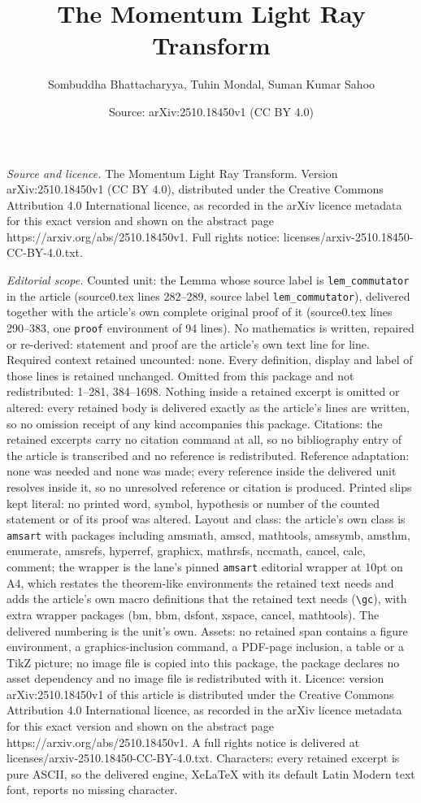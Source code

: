 \documentclass[10pt,a4paper]{amsart}
\title[The Momentum Light Ray Transform]{The Momentum Light Ray Transform}
\author{Sombuddha Bhattacharyya, Tuhin Mondal, Suman Kumar Sahoo}
\date{Source: arXiv:2510.18450v1 (CC BY 4.0)}
\begin{document}
\maketitle

\noindent\emph{Source and licence.} The Momentum Light Ray Transform. Version arXiv:2510.18450v1 (CC BY 4.0), distributed under the Creative Commons Attribution 4.0 International licence, as recorded in the arXiv licence metadata for this exact version and shown on the abstract page https://arxiv.org/abs/2510.18450v1. Full rights notice: licenses/arxiv-2510.18450-CC-BY-4.0.txt.\par\smallskip

\noindent\textit{Editorial scope.} Counted unit: the Lemma whose source label is \texttt{lem\_commutator} in the article (source0.tex lines 282--289, source label \texttt{lem\_commutator}), delivered together with the article's own complete original proof of it (source0.tex lines 290--383, one \texttt{proof} environment of 94 lines). No mathematics is written, repaired or re-derived: statement and proof are the article's own text line for line. Required context retained uncounted: none. Every definition, display and label of those lines is retained unchanged. Omitted from this package and not redistributed: 1--281, 384--1698. Nothing inside a retained excerpt is omitted or altered: every retained body is delivered exactly as the article's lines are written, so no omission receipt of any kind accompanies this package. Citations: the retained excerpts carry no citation command at all, so no bibliography entry of the article is transcribed and no reference is redistributed. Reference adaptation: none was needed and none was made; every reference inside the delivered unit resolves inside it, so no unresolved reference or citation is produced. Printed slips kept literal: no printed word, symbol, hypothesis or number of the counted statement or of its proof was altered. Layout and class: the article's own class is \texttt{amsart} with packages including amsmath, amscd, mathtools, amssymb, amsthm, enumerate, amsrefs, hyperref, graphicx, mathrsfs, nccmath, cancel, calc, comment; the wrapper is the lane's pinned \texttt{amsart} editorial wrapper at 10pt on A4, which restates the theorem-like environments the retained text needs and adds the article's own macro definitions that the retained text needs (\texttt{\textbackslash gc}), with extra wrapper packages (bm, bbm, dsfont, xspace, cancel, mathtools). The delivered numbering is the unit's own. Assets: no retained span contains a figure environment, a graphics-inclusion command, a PDF-page inclusion, a table or a TikZ picture; no image file is copied into this package, the package declares no asset dependency and no image file is redistributed with it. Licence: version arXiv:2510.18450v1 of this article is distributed under the Creative Commons Attribution 4.0 International licence, as recorded in the arXiv licence metadata for this exact version and shown on the abstract page https://arxiv.org/abs/2510.18450v1. A full rights notice is delivered at licenses/arxiv-2510.18450-CC-BY-4.0.txt. Characters: every retained excerpt is pure ASCII, so the delivered engine, XeLaTeX with its default Latin Modern text font, reports no missing character.
\end{document}
